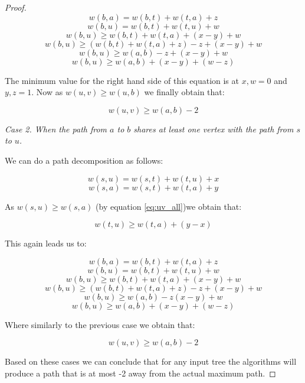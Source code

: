 \begin{proof}
$$ w(b, a) = w(b, t) + w(t, a) + z  $$
$$ w(b, u) = w(b, t) + w(t, u) + w  $$
$$ w(b, u) \ge w(b, t) + w(t, a) + (x - y) + w $$
$$ w(b, u) \ge (w(b, t) + w(t, a) + z) - z + (x - y) + w $$
$$ w(b, u) \ge w(a, b) - z + (x - y) + w $$
$$ w(b, u) \ge w(a, b) + (x - y) + (w - z) $$

The minimum value for the right hand side of this equation is at $x, w = 0$ and $y, z = 1$. Now as $w(u, v) \ge w(u, b)$ we finally obtain that:

$$ w(u, v) \ge w(a, b) - 2 $$


{\em Case 2. When the path from $a$ to $b$ shares at least one vertex with the path from $s$ to $u$.}


We can do a path decomposition as follows:

$$ w(s, u) = w(s, t) + w(t, u) + x $$
$$ w(s, a) = w(s, t) + w(t, a) + y $$

As $w(s, u) \ge w(s, a)$ (by equation \ref{eq:uv_all})we obtain that:

$$ w(t, u) \ge w(t, a) + (y - x) $$

This again leads us to:

$$ w(b, a) = w(b, t) + w(t, a) + z  $$
$$ w(b, u) = w(b, t) + w(t, u) + w  $$
$$ w(b, u) \ge w(b, t) + w(t, a) + (x - y) + w $$
$$ w(b, u) \ge (w(b, t) + w(t, a) + z) - z + (x - y) + w $$
$$ w(b, u) \ge w(a, b) - z (x - y) + w $$
$$ w(b, u) \ge w(a, b) + (x - y) + (w - z) $$

Where similarly to the previous case we obtain that:

$$ w(u, v) \ge w(a, b) - 2 $$


Based on these cases we can conclude that for any input tree the algorithms will produce a path that is at most -2 away from the actual maximum path.




\end{proof}

\cite{parikh1980adaptive}
